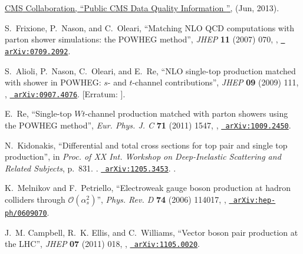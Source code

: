 \documentclass[12pt]{thesis}  %
\begin{document}
\begin{thebibliography}{100}
\href {https://twiki.cern.ch/twiki/bin/view/CMSPublic/DataQuality} {{ CMS}
  Collaboration, ``{Public CMS Data Quality Information }'',} (Jun, 2013).

\hrefCMSnoop {} {S.~Frixione, P.~Nason, and C.~Oleari, ``Matching {NLO QCD}
  computations with parton shower simulations: the {POWHEG} method'',} \textit{
  JHEP} \textbf{ 11} (2007) 070,
  \href{http://dx.doi.org/10.1088/1126-6708/2007/11/070}{},
  \href{http://www.arXiv.org/abs/0709.2092}{\texttt{ arXiv:0709.2092}}.

\hrefCMSnoop {} {S.~Alioli, P.~Nason, C.~Oleari, and E.~Re, ``{NLO single-top
  production matched with shower in POWHEG: $s$- and $t$-channel
  contributions}'',} \textit{ JHEP} \textbf{ 09} (2009) 111,
  \href{http://dx.doi.org/10.1088/1126-6708/2009/09/111}{},
  \href{http://www.arXiv.org/abs/0907.4076}{\texttt{ arXiv:0907.4076}}.
[Erratum: ].

\hrefCMSnoop {} {E.~Re, ``{Single-top $Wt$-channel production matched with
  parton showers using the POWHEG method}'',} \textit{ Eur. Phys. J. C}
  \textbf{ 71} (2011) 1547,
  \href{http://dx.doi.org/10.1140/epjc/s10052-011-1547-z}{},
\href{http://www.arXiv.org/abs/1009.2450}{\texttt{ arXiv:1009.2450}}.

\hrefCMSnoop {} {N.~Kidonakis, ``{Differential and total cross sections for top
  pair and single top production}'',} in \textit{ Proc. of {XX} Int. Workshop
  on Deep-Inelastic Scattering and Related Subjects}, p.~831.
.
\newblock \href{http://www.arXiv.org/abs/1205.3453}{\texttt{ arXiv:1205.3453}}.
\newblock
\href{http://dx.doi.org/10.3204/DESY-PROC-2012-02/251}{}.

\hrefCMSnoop {} {K.~Melnikov and F.~Petriello, ``Electroweak gauge boson
  production at hadron colliders through $\mathcal{O}(\alpha_{s}^2)$'',}
  \textit{ Phys. Rev. D} \textbf{ 74} (2006) 114017,
  \href{http://dx.doi.org/10.1103/PhysRevD.74.114017}{},
  \href{http://www.arXiv.org/abs/hep-ph/0609070}{\texttt{
  arXiv:hep-ph/0609070}}.

\hrefCMSnoop {} {J.~M. Campbell, R.~K. Ellis, and C.~Williams, ``Vector boson
  pair production at the {LHC}'',} \textit{ JHEP} \textbf{ 07} (2011) 018,
  \href{http://dx.doi.org/10.1007/JHEP07(2011)018}{},
  \href{http://www.arXiv.org/abs/1105.0020}{\texttt{ arXiv:1105.0020}}.


\end{thebibliography}
\end{document}
